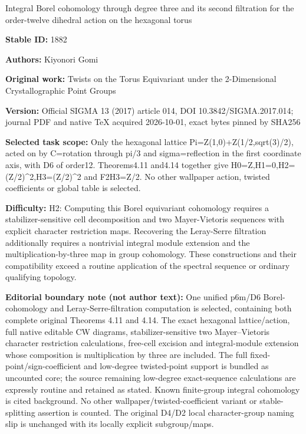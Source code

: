 \documentclass[11pt]{article}
\theoremstyle{definition}
\begin{document}
\begin{center}\Large Integral Borel cohomology through degree three and its second filtration for the order-twelve dihedral action on the hexagonal torus\end{center}
\noindent\textbf{Stable ID:} 1882\par
\noindent\textbf{Authors:} Kiyonori Gomi\par
\noindent\textbf{Original work:} Twists on the Torus Equivariant under the 2-Dimensional Crystallographic Point Groups\par
\noindent\textbf{Version:} Official SIGMA 13 (2017) article 014, DOI 10.3842/SIGMA.2017.014; journal PDF and native TeX acquired 2026-10-01, exact bytes pinned by SHA256\par
\noindent\textbf{Selected task scope:} Only the hexagonal lattice Pi=\allowbreak{}Z(1,0)+\allowbreak{}Z(1/2,sqrt(3)/2), acted on by C=\allowbreak{}rotation through pi/3 and sigma=\allowbreak{}reflection in the first coordinate axis, with D6 of order12. Theorems4.11 and4.14 together give H0=\allowbreak{}Z,H1=\allowbreak{}0,H2=\allowbreak{}(Z/2)\textasciicircum{}2,H3=\allowbreak{}(Z/2)\textasciicircum{}2 and F2H3=\allowbreak{}Z/2. No other wallpaper action, twisted coefficients or global table is selected.\par
\noindent\textbf{Difficulty:} H2: Computing this Borel equivariant cohomology requires a stabilizer-sensitive cell decomposition and two Mayer-Vietoris sequences with explicit character restriction maps. Recovering the Leray-Serre filtration additionally requires a nontrivial integral module extension and the multiplication-by-three map in group cohomology. These constructions and their compatibility exceed a routine application of the spectral sequence or ordinary qualifying topology.\par
\noindent\textbf{Editorial boundary note (not author text):} One unified p6m/D6 Borel-cohomology and Leray-Serre-filtration computation is selected, containing both complete original Theorems 4.11 and 4.14. The exact hexagonal lattice/action, full native editable CW diagrams, stabilizer-sensitive two Mayer–Vietoris character restriction calculations, free-cell excision and integral-module extension whose composition is multiplication by three are included. The full fixed-point/sign-coefficient and low-degree twisted-point support is bundled as uncounted core; the source remaining low-degree exact-sequence calculations are expressly routine and retained as stated. Known finite-group integral cohomology is cited background. No other wallpaper/twisted-coefficient variant or stable-splitting assertion is counted. The original D4/D2 local character-group naming slip is unchanged with its locally explicit subgroup/maps.\par
\end{document}
